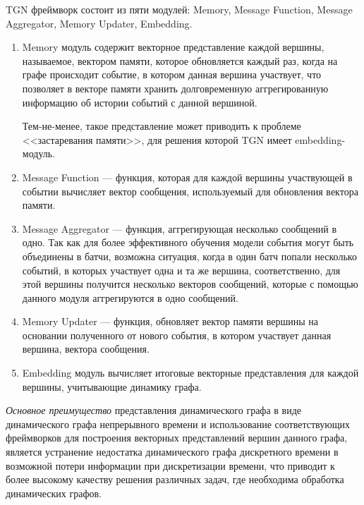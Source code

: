 \documentclass[a4paper,14pt,oneside]{mipt-thesis-ms}
\begin{document}
TGN фреймворк состоит из пяти модулей: Memory, Message Function, Message Aggregator, Memory Updater, Embedding.
\begin{enumerate}
\item Memory модуль содержит векторное представление каждой вершины, называемое, вектором памяти, которое обновляется каждый раз, когда на графе происходит событие, в котором данная вершина участвует, что позволяет в векторе памяти хранить долговременную аггрегированную информацию об истории событий с данной вершиной.

Тем-не-менее, такое представление может приводить к проблеме <<застаревания памяти>>\cite{kazemi01}, для решения которой TGN имеет embedding-модуль.

\item Message Function --- функция, которая для каждой вершины участвующей в событии вычисляет вектор сообщения, используемый для обновления вектора памяти.

\item Message Aggregator --- функция, аггрегирующая несколько сообщений в одно. Так как для более эффективного обучения модели события могут быть объединены в батчи, возможна ситуация, когда в один батч попали несколько событий, в которых участвует одна и та же вершина, соответственно, для этой вершины получится несколько векторов сообщений, которые с помощью данного модуля аггрегируются в одно сообщений.

\item Memory Updater --- функция, обновляет вектор памяти вершины на основании полученного от нового события, в котором участвует данная вершина, вектора сообщения.

\item Embedding модуль вычисляет итоговые векторные представления для каждой вершины, учитывающие динамику графа.
\end{enumerate}

{\it Основное преимущество} представления динамического графа в виде динамического графа непрерывного времени и использование соответствующих фреймворков для построения векторных представлений вершин данного графа, является устранение недостатка динамического графа дискретного времени в возможной потери информации при дискретизации времени, что приводит к более высокому качеству решения различных задач, где необходима обработка динамических графов.\\


\end{document}
